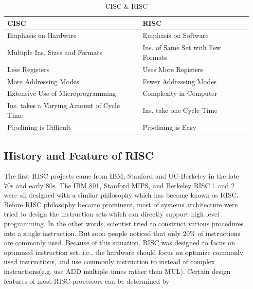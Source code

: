 \documentclass[conference]{IEEEtran}
\begin{document}
\begin{table}[h]
\centering
\caption{CISC \& RISC}
\label{my-label}
\begin{tabular}{ll}
\hline
CISC                                              & RISC                                      \\ \hline
Emphasis on Hardware                              & Emphasis on Software                      \\
Multiple Ins. Sizes and Formats            & Ins. of Same Set with Few Formats \\
Less Registers                                    & Uses More Registers                       \\
More Addressing Modes                             & Fewer Addressing Modes                    \\
Extensive Use of Microprogramming                 & Complexity in Computer                    \\
Ins. takes a Varying Amount of Cycle Time & Ins. take one Cycle Time          \\
Pipelining is Difficult                           & Pipelining is Easy                        \\ \hline
\end{tabular}
\end{table}

\subsection{History and Feature of RISC}
The first RISC projects came from IBM, Stanford and UC-Berkeley in the late 70s and early 80s. The IBM 801, Stanford MIPS, and Berkeley RISC 1 and 2 were all designed with a similar philosophy which has become known as RISC. Before RISC philosophy became prominent, most of systems architecture were tried to design the instruction sets which can directly support high level programming\cite{C}. In the other words, scientist tried to construct various procedures into a single instruction. But soon people noticed that only 20\% of instructions are commonly used. Because of this situation, RISC was designed to focus on optimized instruction set. i.e., the hardware should focus on optimize commonly used instructions, and use commonly instruction to instead of complex instructions(e.g. use ADD multiple times rather than MUL). Certain design features of most RISC processors can be determined by\cite{B}
\end{document}
